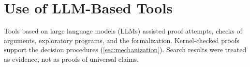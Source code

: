\section*{Use of LLM-Based Tools}

Tools based on large language models (LLMs)
assisted proof attempts, checks of arguments, exploratory programs, and the
formalization. Kernel-checked proofs support the decision procedures
(\cref{sec:mechanization}).
Search results were treated as evidence, not as proofs of universal claims.
